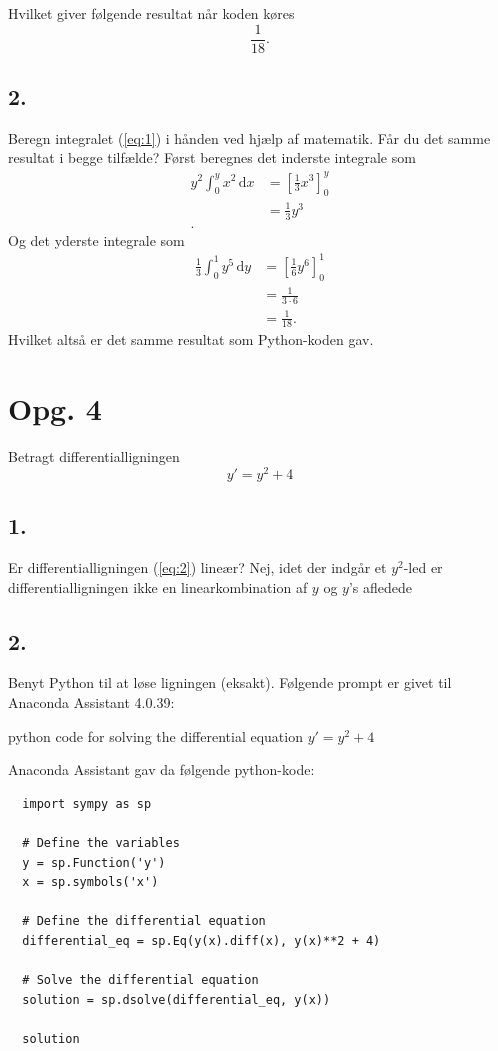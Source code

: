 \documentclass[12pt]{article}
\theoremstyle{definition}
\begin{document}
Hvilket giver følgende resultat når koden køres
\[ 
  \frac{1}{18}
.\]

\subsection*{2.}
Beregn integralet (\ref{eq:1}) i hånden ved hjælp af matematik. Får du det samme resultat i begge tilfælde?
\bigbreak
Først beregnes det inderste integrale som
\begin{align*}
  y^2 \int_{0}^{y} x^2 \, \mathrm{d}x &= \left[ \frac{1}{3}x^{3} \right]_0^{y} \\
  &= \frac{1}{3}y^{3} \\
.\end{align*}
Og det yderste integrale som
\begin{align*}
  \frac{1}{3} \int_{0}^{1} y^{5} \, \mathrm{d}y &= \left[ \frac{1}{6}y^{6} \right]_0^1  \\
  &= \frac{1}{3\cdot6} \\
  &= \frac{1}{18}
.\end{align*}
Hvilket altså er det samme resultat som Python-koden gav.


\section*{Opg. 4}
Betragt differentialligningen
\begin{equation} \label{eq:2}
  y' = y^2 + 4
\end{equation}

\subsection*{1.}
Er differentialligningen (\ref{eq:2}) lineær?
\bigbreak
Nej, idet der indgår et $y^2$-led er differentialligningen ikke en linearkombination af $y$ og $y$'s afledede

\subsection*{2.}
Benyt Python til at løse ligningen (eksakt).
\bigbreak
Følgende prompt er givet til Anaconda Assistant 4.0.39: 

\begin{blueline}
  python code for solving the differential equation $y' = y^2 + 4$ 
\end{blueline}

Anaconda Assistant gav da følgende python-kode:
\begin{verbatim}
  import sympy as sp

  # Define the variables
  y = sp.Function('y')
  x = sp.symbols('x')

  # Define the differential equation
  differential_eq = sp.Eq(y(x).diff(x), y(x)**2 + 4)

  # Solve the differential equation
  solution = sp.dsolve(differential_eq, y(x))

  solution
\end{verbatim}
\end{document}
